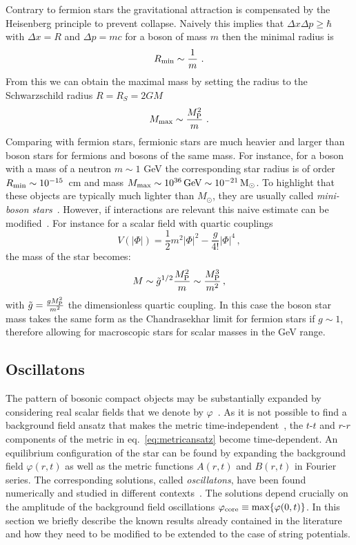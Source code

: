 \documentclass[11pt,a4paper]{article}
\newcommand{\be}{\begin{equation}}
\newcommand{\ee}{\end{equation}}
\begin{document}
Contrary to fermion stars the gravitational attraction is compensated by the Heisenberg principle to prevent collapse. Naively this implies that  $\Delta x \Delta p\geq \hbar $ with $\Delta x= R$ and $\Delta p=mc$ for a boson of mass $m$ then the minimal radius is
\be
R_{\rm min}\sim \frac{1}{m}~.
\ee
From this we can obtain the maximal mass by setting the radius to the Schwarzschild radius $R=R_S=2GM$
\be
M_{\rm max}\sim \frac{M_{\rm P}^2}{m}~.
\ee
Comparing with fermion stars, fermionic stars are much heavier and larger than boson stars for fermions and bosons of the same mass. For instance, for a boson with a mass of a neutron $m\sim 1$ GeV the corresponding star radius is of order $R_{\rm min}\sim 10^{-15}$~cm and mass $M_{\rm max}\sim 10^{36}\,\rm{GeV}\sim 10^{-21}\, M_\odot$. To highlight that these objects are typically much lighter than $M_{\odot}$, they are usually called \textit{mini-boson stars}~\cite{Kaup:1968zz, Ruffini:1969qy}. However, if interactions are relevant this naive estimate can be modified~\cite{Colpi:1986ye}. For instance for a scalar field with quartic couplings
\be
V(|\Phi|)= \frac{1}{2} m^2 |\Phi|^2 - \frac{g}{4!} |\Phi|^4 \,,
\ee
the mass of the star becomes:
\be
\label{eq:MassEnhancement}
M\sim \tilde{g}^{1/2} \frac{M_{\rm P}^2}{m}\sim \frac{M_{\rm P}^3}{m^2} \,,
\ee
with $\tilde{g} = \frac{g M_{\rm P}^2}{m^2}$ the dimensionless quartic coupling. In this case the boson star mass takes the same form as the Chandrasekhar limit for fermion stars if $g\sim 1$, therefore allowing for macroscopic stars for scalar masses in the GeV range. 
 
\subsection{Oscillatons}
\label{sec:Oscillatons}
 
The pattern of bosonic compact objects may be substantially expanded by considering real scalar fields that we denote by $\varphi$~\cite{Seidel:1991zh}. As it is not possible to find a background field ansatz that makes the metric time-independent~\cite{UrenaLopez:2001tw, UrenaLopez:2002gx, UrenaLopez:2012zz}, the $t$-$t$ and $r$-$r$ components of the metric in eq.~\eqref{eq:metricansatz} become time-dependent. An equilibrium configuration of the star can be found by expanding the background field $\varphi(r,t)$ as well as the metric functions $A(r,t)$ and $B(r,t)$ in Fourier series. The corresponding solutions, called \textit{oscillatons}, have been found numerically and studied in different contexts~\cite{UrenaLopez:2001tw, UrenaLopez:2002gx, Alcubierre:2003sx, Guzman:2004wj}. The solutions depend crucially on the amplitude of the background field oscillations $\varphi_{\rm core} \equiv \text{max}\{\varphi(0,t)\}$. In this section we briefly describe the known results already contained in the literature and how they need to be modified to be extended to the case of string potentials.\\
\end{document}
